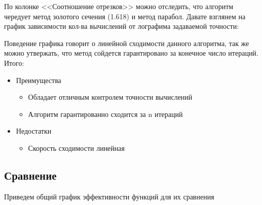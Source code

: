 \documentclass[a4paper, 14pt]{article}
\begin{document}
	По колонке <<Соотношение отрезков>> можно отследить, что алгоритм чередует метод золотого сечения (1.618) и метод парабол. Давате взглянем на график зависимости кол-ва вычислений от лографима задаваемой точности: 
	
	
	Поведение графика говорит о линейной сходимости данного алгоритма, так же можно утвержать, что метод сойдется гарантировано за конечное число итераций.\\
	Итого: 
	
	\begin{itemize}
		\item Преимущества
			\begin{itemize}
				\item Обладает отличным контролем точности вычислений 
				\item Алгоритм гарантированно сходится за n итераций 
 			\end{itemize}
		\item Недостатки
			\begin{itemize}
			\item Скорость сходимости линейная
			\end{itemize}
	\end{itemize}
	
	\subsection*{Сравнение}
	
	Приведем общий график эффективности функций для их сравнения
	
\end{document}
